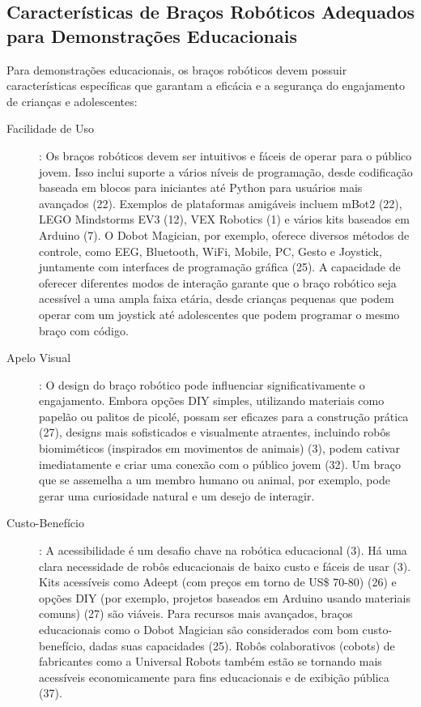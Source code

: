 \documentclass[%
  a4paper,%
  12pt,%
  fleqn,%
  english,%
  brazilian,%
]{article}
\begin{document}
\subsection{Características de Braços Robóticos Adequados para Demonstrações Educacionais}
Para demonstrações educacionais, os braços robóticos devem possuir características específicas que garantam a eficácia e a segurança do engajamento de crianças e adolescentes:
	\begin{description}
		\item [Facilidade de Uso]: Os braços robóticos devem ser intuitivos e fáceis de operar para o público jovem. Isso inclui suporte a vários níveis de programação, desde codificação baseada em blocos para iniciantes até Python para usuários mais avançados (22). Exemplos de plataformas amigáveis incluem mBot2 (22), LEGO Mindstorms EV3 (12), VEX Robotics (1) e vários kits baseados em Arduino (7). O Dobot Magician, por exemplo, oferece diversos métodos de controle, como EEG, Bluetooth, WiFi, Mobile, PC, Gesto e Joystick, juntamente com interfaces de programação gráfica (25). A capacidade de oferecer diferentes modos de interação garante que o braço robótico seja acessível a uma ampla faixa etária, desde crianças pequenas que podem operar com um joystick até adolescentes que podem programar o mesmo braço com código.
		\item [Apelo Visual]: O design do braço robótico pode influenciar significativamente o engajamento. Embora opções DIY simples, utilizando materiais como papelão ou palitos de picolé, possam ser eficazes para a construção prática (27), designs mais sofisticados e visualmente atraentes, incluindo robôs biomiméticos (inspirados em movimentos de animais) (3), podem cativar imediatamente e criar uma conexão com o público jovem (32). Um braço que se assemelha a um membro humano ou animal, por exemplo, pode gerar uma curiosidade natural e um desejo de interagir.
		\item [Custo-Benefício]: A acessibilidade é um desafio chave na robótica educacional (3). Há uma clara necessidade de robôs educacionais de baixo custo e fáceis de usar (3). Kits acessíveis como Adeept (com preços em torno de US\$ 70-80) (26) e opções DIY (por exemplo, projetos baseados em Arduino usando materiais comuns) (27) são viáveis. Para recursos mais avançados, braços educacionais como o Dobot Magician são considerados com bom custo-benefício, dadas suas capacidades (25). Robôs colaborativos (cobots) de fabricantes como a Universal Robots também estão se tornando mais acessíveis economicamente para fins educacionais e de exibição pública (37).

\end{description}
\end{document}
